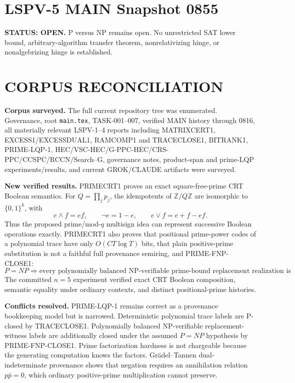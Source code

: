 \documentclass[11pt]{article}
\begin{document}
\section*{LSPV-5 MAIN Snapshot 0855}
\textbf{STATUS: OPEN.} P versus NP remains open. No unrestricted SAT lower bound, arbitrary-algorithm transfer theorem, nonrelativizing hinge, or nonalgebrizing hinge is established.

\section*{CORPUS RECONCILIATION}
\textbf{Corpus surveyed.} The full current repository tree was enumerated. Governance, root \texttt{main.tex}, TASK-001--007, verified MAIN history through 0816, all materially relevant LSPV-1--4 reports including MATRIXCERT1, EXCESS1/EXCESSDUAL1, RAMCOMP1 and TRACECLOSE1, BITRANK1, PRIME-LQP-1, HEC/VSC-HEC/G-PPC-HEC/CRS-PPC/CCSPC/RCCN/Search--G, governance notes, product-span and prime-LQP experiments/results, and current GROK/CLAUDE artifacts were surveyed.

\textbf{New verified results.} PRIMECRT1 proves an exact square-free-prime CRT Boolean semantics. For \(Q=\prod_jp_j\), the idempotents of \(\mathbb Z/Q\mathbb Z\) are isomorphic to \(\{0,1\}^k\), with
\[
e\wedge f=ef,\qquad \neg e=1-e,\qquad e\vee f=e+f-ef.
\]
Thus the proposed prime/mod-\(q\) multisign idea can represent successive Boolean operations exactly. PRIMECRT1 also proves that positional prime-power codes of a polynomial trace have only \(O(CT\log T)\) bits, that plain positive-prime substitution is not a faithful full provenance semiring, and PRIME-FNP-CLOSE1:
\[
P=NP\Longrightarrow
\text{every polynomially balanced NP-verifiable prime-bound replacement realization is selectable in FP.}
\]
The committed \(n=5\) experiment verified exact CRT Boolean composition, semantic equality under ordinary contexts, and distinct positional-prime histories.

\textbf{Conflicts resolved.} PRIME-LQP-1 remains correct as a provenance bookkeeping model but is narrowed. Deterministic polynomial trace labels are P-closed by TRACECLOSE1. Polynomially balanced NP-verifiable replacement-witness labels are additionally closed under the assumed \(P=NP\) hypothesis by PRIME-FNP-CLOSE1. Prime factorization hardness is not chargeable because the generating computation knows the factors. Gr\"adel--Tannen dual-indeterminate provenance shows that negation requires an annihilation relation \(p\bar p=0\), which ordinary positive-prime multiplication cannot preserve.
\end{document}
